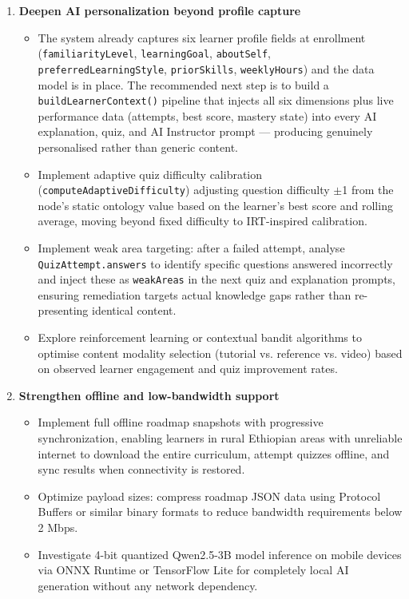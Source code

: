 \begin{enumerate}
    \item \textbf{Deepen AI personalization beyond profile capture}
        \begin{itemize}
            \item The system already captures six learner profile fields at enrollment (\texttt{familiarityLevel}, \texttt{learningGoal}, \texttt{aboutSelf}, \texttt{preferredLearningStyle}, \texttt{priorSkills}, \texttt{weeklyHours}) and the data model is in place. The recommended next step is to build a \texttt{buildLearnerContext()} pipeline that injects all six dimensions plus live performance data (attempts, best score, mastery state) into every AI explanation, quiz, and AI Instructor prompt --- producing genuinely personalised rather than generic content.
            \item Implement adaptive quiz difficulty calibration (\texttt{computeAdaptiveDifficulty}) adjusting question difficulty $\pm$1 from the node's static ontology value based on the learner's best score and rolling average, moving beyond fixed difficulty to IRT-inspired calibration.
            \item Implement weak area targeting: after a failed attempt, analyse \texttt{QuizAttempt.answers} to identify specific questions answered incorrectly and inject these as \texttt{weakAreas} in the next quiz and explanation prompts, ensuring remediation targets actual knowledge gaps rather than re-presenting identical content.
            \item Explore reinforcement learning or contextual bandit algorithms to optimise content modality selection (tutorial vs. reference vs. video) based on observed learner engagement and quiz improvement rates.
        \end{itemize}

    \item \textbf{Strengthen offline and low-bandwidth support}
        \begin{itemize}
            \item Implement full offline roadmap snapshots with progressive synchronization, enabling learners in rural Ethiopian areas with unreliable internet to download the entire curriculum, attempt quizzes offline, and sync results when connectivity is restored.
            \item Optimize payload sizes: compress roadmap JSON data using Protocol Buffers or similar binary formats to reduce bandwidth requirements below 2 Mbps.
            \item Investigate 4-bit quantized Qwen2.5-3B model inference on mobile devices via ONNX Runtime or TensorFlow Lite for completely local AI generation without any network dependency.
        \end{itemize}


\end{enumerate}
